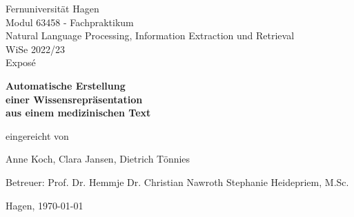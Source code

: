 \thispagestyle{empty}

\begin{titlepage}


\begin{center}

{\huge Fernuniversität Hagen} \\ [1,0cm]

{\Large Modul 63458 - Fachpraktikum \\ [0,3 cm]
Natural Language Processing, Information Extraction und Retrieval \\ [0,3 cm]
WiSe 2022/23} \\ [3cm]

{\huge Expos\'e}

\vspace{8ex}

{\huge\bfseries
Automatische Erstellung \\[0,5cm]
einer Wissensrepräsentation \\[0,5cm]
aus einem medizinischen Text \\[0,5cm]
}

\vspace{8ex}

{\large eingereicht von}

\vspace{4ex}

{\Large Anne Koch, Clara Jansen, Dietrich Tönnies}
 
\end{center}

\vspace{6ex}

{\Large \hspace{2,4cm} Betreuer:  Prof. Dr. Hemmje
\vspace{0,2cm}
  Dr. Christian Nawroth
\vspace{0,5cm}
 Stephanie Heidepriem, M.Sc.}

\vfill

\begin{center}
{\large Hagen, \today}
\end{center}

\end{titlepage}

